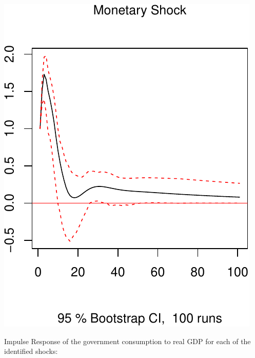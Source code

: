 \documentclass[11pt,preprint, authoryear]{elsarticle}
\numberwithin{equation}{section}
\numberwithin{figure}{section}
\numberwithin{table}{section}
\begin{document}
\includegraphics{TS_proj_files/figure-latex/unnamed-chunk-31-3.pdf}

Impulse Response of the government consumption to real GDP for each of
the identified shocks:
\end{document}
